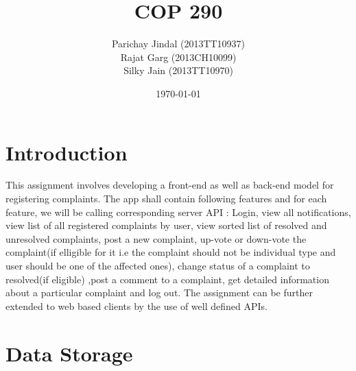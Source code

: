 \documentclass[a4paper]{article}
\title{COP 290}
\author{Parichay Jindal (2013TT10937) \\ Rajat Garg (2013CH10099) \\ Silky Jain (2013TT10970) }
\date{\today}
\begin{document}
\maketitle

\section{Introduction}

This assignment involves developing a front-end as well as back-end model for registering complaints. The app shall contain following features and for each feature, we will be calling corresponding server API :
Login, view all notifications, view list of all registered complaints by user, view sorted list of resolved and unresolved complaints, post a new complaint, up-vote or down-vote the complaint(if elligible for it i.e the complaint should not be individual type and user should be one of the affected ones), change status of a complaint to resolved(if eligible) ,post a comment to a complaint, get detailed information about a particular complaint and log out.
The assignment can be further extended to web based clients by the use of well defined APIs.


\section{Data Storage}
\end{document}
